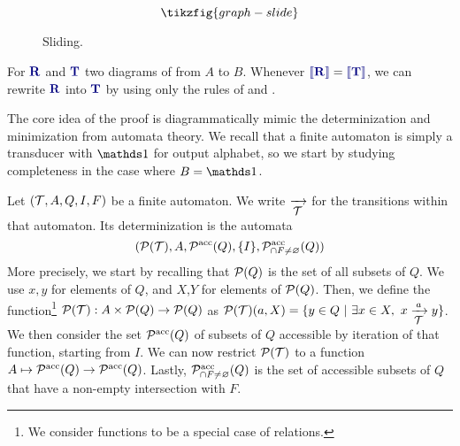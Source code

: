 \begin{figure}[h]
	\[\tikzfig{graph-slide}\]
	\caption{Sliding.}
	\label{fig:graph-slide}
\end{figure}

\begin{theorem}[Completeness]\label{thm:completeness-fin} For $\bR$ and $\bT$ two diagrams of  from $A$ to $B$. Whenever $\binterp{\bR} = \binterp{\bT}$, we can rewrite $\bR$ into $\bT$ by using only the rules of  and .
\end{theorem}

The core idea of the proof is diagrammatically mimic the determinization and minimization from automata theory. We recall that a finite automaton is simply a transducer with $\one$ for output alphabet, so we start by studying completeness in the case where $B = \one$.

\begin{definition}[Determinization]
	Let $(\T,A,Q,I,F)$ be a finite automaton. We write $\xrightarrow[\text{\small $\T$}]{}$ for the transitions within that automaton. Its determinization is the automata \[(\P(\T), A, \P^{\textup{acc}}(Q), \{I\}, \P^{\textup{acc}}_{\cap F \neq \varnothing}(Q))\]
	More precisely, we start by recalling that $\P(Q)$ is the set of all subsets of $Q$. We use $x,y$ for elements of $Q$, and $X$,$Y$ for elements of $\P(Q)$.  Then, we define the function\footnote{We consider functions to be a special case of relations.} $\P(\T): A \times \P(Q) \to \P(Q)$ as 
	$ \P(\T)(a,X)=\{y\in Q ~|~ \exists x\in X,~  x \xrightarrow[\text{\small $\T$}]{a} y \} $.
	We then consider the set $\P^{\textup{acc}}(Q)$ of subsets of $Q$ accessible by iteration of that function, starting from $I$. We can now restrict $\P(\T)$ to a function $A \mapsto \P^{\textup{acc}}(Q) \to \P^{\textup{acc}}(Q)$. Lastly, $\P^{\textup{acc}}_{\cap F \neq \varnothing}(Q)$ is the set of accessible subsets of $Q$ that have a non-empty intersection with $F$.
\end{definition}

